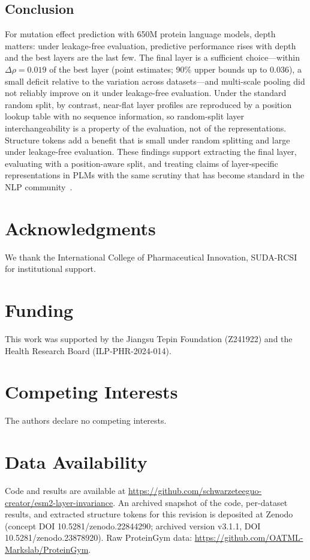 \documentclass[11pt,a4paper]{article}
\newcommand{\revised}[1]{#1}
\newcommand{\rtwo}[1]{#1}
\newcommand{\rthree}[1]{#1}
\begin{document}
\subsection{Conclusion}

\rtwo{For mutation effect prediction with 650M protein language models, depth
matters: under leakage-free evaluation, predictive performance rises with depth and the
best layers are the last few. The final layer is a sufficient choice---within
\rthree{$\Delta\rho = 0.019$ of the best layer (point estimates; 90\% upper bounds up to
0.036), a small deficit relative to the variation across datasets}---and \rthree{multi-scale
pooling did not reliably improve on it} under leakage-free
evaluation. Under the standard random split, by contrast, near-flat layer profiles are
reproduced by a position lookup table with no sequence information, so random-split
layer interchangeability is a property of the evaluation, not of the representations.
Structure tokens add a benefit that is small under random splitting and large under
leakage-free evaluation. These findings support extracting the final layer, evaluating
with a position-aware split, and treating claims of layer-specific representations in
PLMs with the same scrutiny that has become standard in the NLP
community~\cite{rogers2021bertology}.}

\section*{Acknowledgments}
We thank the International
College of Pharmaceutical Innovation, SUDA-RCSI for institutional support.

\section*{Funding}
\revised{This work was supported by the Jiangsu Tepin Foundation (Z241922) and
the Health Research Board (ILP-PHR-2024-014).}

\section*{Competing Interests}
\revised{The authors declare no competing interests.}

\section*{Data Availability}
Code and results are available at \url{https://github.com/schwarzeteeguo-creator/esm2-layer-invariance}.
\revised{An archived snapshot of the code, per-dataset results, and extracted
structure tokens for this revision is deposited at Zenodo (concept DOI
10.5281/zenodo.22844290; archived version \rthree{v3.1.1, DOI 10.5281/zenodo.23878920}).}
Raw ProteinGym data: \url{https://github.com/OATML-Markslab/ProteinGym}.
\end{document}
